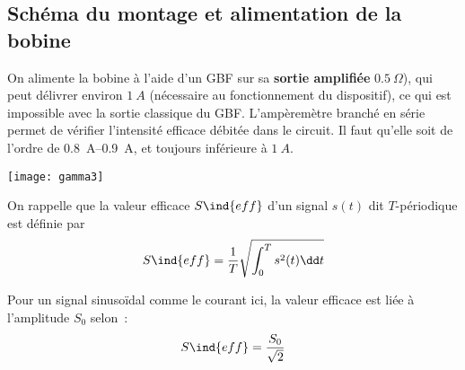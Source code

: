 \documentclass[a4paper, 11pt, final, garamond]{book}
\begin{document}
\subsection{Schéma du montage et alimentation de la bobine}
\begin{minipage}{0.56\linewidth}
    On alimente la bobine à l'aide d'un GBF sur sa \textbf{sortie amplifiée}
    $\SI{0,5}{\Omega}$), qui peut délivrer environ $\SI{1}{A}$ (nécessaire au
    fonctionnement du dispositif), ce qui est impossible avec la sortie
    classique du GBF. \bigbreak
    L'ampèremètre branché en série permet de vérifier l'intensité efficace
    débitée dans le circuit. Il faut qu'elle soit de l'ordre de
    \SIrange{0.8}{0.9}{A}, et toujours inférieure à $\SI{1}{A}$.
\end{minipage}
\hfill
\begin{minipage}{0.40\linewidth}
    \begin{center}
        \texttt{[image: gamma3]}
    \end{center}
\end{minipage}

\begin{minipage}{0.45\linewidth}
    On rappelle que la valeur efficace $S\ind{eff}$ d'un signal $s(t)$ dit
    $T$-périodique est définie par
    \[
        S\ind{eff} = \frac{1}{T} \sqrt{\int_{0}^{T} s^2(t)\dd t}
    \]
\end{minipage}
\hfill
\begin{minipage}{0.45\linewidth}
    Pour un signal sinusoïdal comme le courant ici, la valeur efficace est liée
    à l'amplitude $S_0$ selon~:
    \[
        S\ind{eff} = \frac{S_0}{\sqrt{2}}
    \]
\end{minipage}
\end{document}
